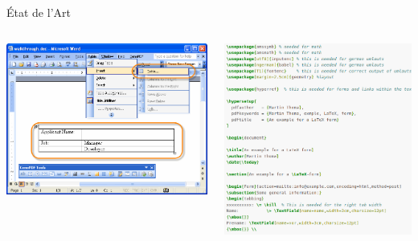 \documentclass[11pt]{beamer}
\begin{document}
\begin{frame}{État de l'Art}
	\begin{columns}[t]
	\begin{column}[T]{.5\textwidth}
		\includegraphics[width=.45\paperwidth]{images/add-table.png}
  	\end{column}
  	\begin{column}[T]{.5\textwidth}
  		\includegraphics[width=.45\paperwidth]{images/tex.png}
	\end{column}
\end{columns}
\end{frame}
\end{document}
